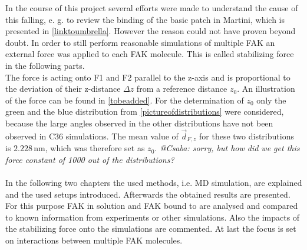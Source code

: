 In the course of this project several efforts were made to understand the cause of this falling, e. g. to review the binding of the basic patch in Martini, which is presented in \autoref{linktoumbrella}. However the reason could not have proven beyond doubt. In order to still perform reasonable simulations of multiple FAK an external force was applied to each FAK molecule. This is called stabilizing force in the following parts.\\
The force is acting onto F1 and F2 parallel to the z-axis and is proportional to the deviation of their z-distance $\Delta z$ from a reference distance $z_0$. An illustration of the force can be found in \autoref{tobeadded}. For the determination of $z_0$ only the green and the blue distribution from \autoref{pictureofdistributions} were considered, because the large angles observed in the other distributions have not been observed in C36 simulations. The mean value of $\vec{d}_{F, z}$ for these two distributions is $2.228\,\si{\nano\metre}$, which was therefore set as $z_0$. %
\textit{@Csaba: sorry, but how did we get this force constant of 1000 out of the distributions?}\\
\\
In the following two chapters the used methods, i.e. MD simulation, are explained and the used setups introduced. Afterwards the obtained results are presented. For this purpose FAK in solution and FAK bound to \pip{} are analysed and compared to known information from experiments or other simulations. Also the impacts of the stabilizing force onto the simulations are commented. At last the focus is set on interactions between multiple FAK molecules.

